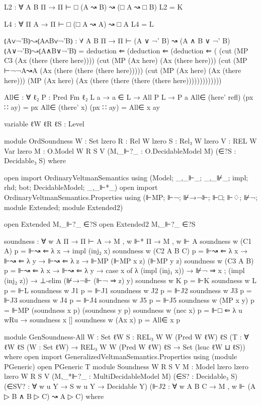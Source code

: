 \begin{spverbatim}
L2 : ∀ {A B Π} → Π ⊢ □ (A ↝ B) ↝ (□ A ↝ □ B)
L2 = K

L4 : ∀ {Π A} → Π ⊢ □ (□ A ↝ A) ↝ □ A
L4 = L

⦅A∨¬'B⦆↝⦅A∧B∨¬'B⦆ : ∀ {A B Π} → Π ⊢ (A ∨ ¬' B) ↝ (A ∧ B ∨ ¬' B)
⦅A∨¬'B⦆↝⦅A∧B∨¬'B⦆ = deduction ⇐ (deduction ⇐ (deduction ⇐ (
  (cut (MP C3 (Ax (there (there here))))
  (cut (MP (Ax here) (Ax (there here)))
  (cut (MP ⊢¬¬A↝A (Ax (there (there (there here)))))
  (cut (MP (Ax here) (Ax (there here))) (MP (Ax here)
  (Ax (there (there (there (there here)))))))))))))


All∈ : ∀ {ℓ₂} {P : Pred Fm ℓ₂} {L a} → a ∈ L → All P L → P a
All∈ (here' refl) (px ∷ ay) = px
All∈ (there' x) (px ∷ ay) = All∈ x ay

variable
  ℓW ℓR ℓS : Level

module OrdSoundness
  {W : Set lzero}
  {R : Rel W lzero}
  {S : Rel₃ W lzero}
  {V : REL W Var lzero}
  {M : O.Model W R S V}
  (M,_⊩?_ : O.DecidableModel M)
  (∈?S : Decidable₃ S)
  where

  open import OrdinaryVeltmanSemantics
    using (Model; _,_⊩_; _,_⊮_; impl; rhd; bot; DecidableModel; _,_⊩*_)
  open import OrdinaryVeltmanSemantics.Properties
    using (⊩MP; ⊩¬; ⊮→¬⊩; ⊩□; ⊩♢; ⊮¬; module Extended; module Extended2)

  open Extended M,_⊩?_ ∈?S
  open Extended2 M,_⊩?_ ∈?S

  soundness : ∀ {w A Π} → Π ⊢ A → M , w ⊩* Π → M , w ⊩ A
  soundness {w} (C1 {A}) p = ⊩↝ ⇐ λ x → impl (inj₂ x)
  soundness {w} (C2 {A} {B} {C}) p = ⊩↝ ⇐ λ x → ⊩↝ ⇐ λ y → ⊩↝ ⇐ λ z → ⊩MP (⊩MP x z) (⊩MP y z)
  soundness {w} (C3 {A} {B}) p = ⊩↝ ⇐
    λ {x → ⊩↝ ⇐ λ y → case x of λ { (impl (inj₁ x)) → ⊮¬ ⇒ x
    ; (impl (inj₂ z)) → ⊥-elim (⊮→¬⊩ (⊩¬ ⇒ z) y)}}
  soundness {w} K p = ⊩K
  soundness {w} L p = ⊩L
  soundness {w} J1 p = ⊩J1
  soundness {w} J2 p = ⊩J2
  soundness {w} J3 p = ⊩J3
  soundness {w} J4 p = ⊩J4
  soundness {w} J5 p = ⊩J5
  soundness {w} (MP x y) p = ⊩MP (soundness x p) (soundness y p)
  soundness {w} (nec x) p = ⊩□ ⇐ λ {u} wRu → soundness x []
  soundness {w} (Ax x) p = All∈ x p

module GenSoundness-All
  {W : Set ℓW}
  {S : REL₃ W W (Pred W ℓW) ℓS}
  (T : ∀ {ℓW ℓS} (W : Set ℓW) → REL₃ W W (Pred W ℓW) ℓS → Set (lsuc ℓW ⊔ ℓS))
  where
  open import GeneralizedVeltmanSemantics.Properties using (module PGeneric)
  open PGeneric T
  module Soundness
    {W R S V}
    {M : Model {lzero} {lzero} {lzero} W R S V}
    (M,_*⊩?_ : MultiDecidableModel M)
    (∈S? : Decidable₃ S)
    (∈SV? : ∀ {w u Y} → S w u Y → Decidable Y)
    (⊩J2 : ∀ {w A B C} → M , w ⊩ (A ▷ B ∧ B ▷ C) ↝ A ▷ C)
    where


\end{spverbatim}
